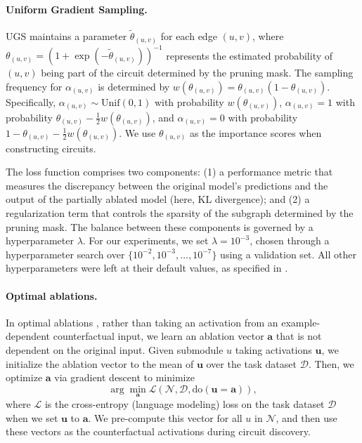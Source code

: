 \documentclass{article}
\theoremstyle{plain}
\theoremstyle{definition}
\theoremstyle{remark}
\begin{document}
\paragraph{Uniform Gradient Sampling.}
UGS maintains a parameter $\tilde{\theta}_{(u,v)}$ for each edge $(u,v)$, where $\theta_{(u,v)} = (1 + \exp(-\tilde{\theta}_{(u,v)}))^{-1}$ represents the estimated probability of $(u,v)$ being part of the circuit determined by the pruning mask. The sampling frequency for $\alpha_{(u,v)}$ is determined by $w(\theta_{(u,v)}) = \theta_{(u,v)}(1 - \theta_{(u,v)})$. Specifically, $\alpha_{(u,v)} \sim \text{Unif}(0, 1)$ with probability  $w(\theta_{(u,v)})$,  $\alpha_{(u,v)} = 1$  with probability  $\theta_{(u,v)} - \frac{1}{2}w(\theta_{(u,v)})$, and $\alpha_{(u,v)} = 0$ with probability $1 - \theta_{(u,v)} - \frac{1}{2}w(\theta_{(u,v)})$.
We use $\theta_{(u,v)}$ as the importance scores when constructing circuits.

The loss function comprises two components: (1) a performance metric that measures the discrepancy between the original model’s predictions and the output of the partially ablated model (here, KL divergence); and (2) a regularization term that controls the sparsity of the subgraph determined by the pruning mask. The balance between these components is governed by a hyperparameter $\lambda$.
For our experiments, we set $\lambda = 10^{-3}$, chosen through a hyperparameter search over $\{10^{-2}, 10^{-3}, \dots, 10^{-7}\}$ using a validation set. All other hyperparameters were left at their default values, as specified in \citet{li2024optimal}.

\paragraph{Optimal ablations.}\label{app:oa} In optimal ablations \citep{li2024optimal}, rather than taking an activation from an example-dependent counterfactual input, we learn an ablation vector $\mathbf{a}$ that is not dependent on the original input. Given submodule $u$ taking activations $\mathbf{u}$, we initialize the ablation vector to the mean of $\mathbf{u}$ over the task dataset $\mathcal{D}$. Then, we optimize $\mathbf{a}$ via gradient descent to minimize
\begin{equation}
    \arg\min_\mathbf{a}\mathcal{L}(\mathcal{N},\mathcal{D},\text{do}(\mathbf{u}=\mathbf{a})),
\end{equation}
where $\mathcal{L}$ is the cross-entropy (language modeling) loss on the task dataset $\mathcal{D}$ when we set $\mathbf{u}$ to $\mathbf{a}$. We pre-compute this vector for all $u$ in $\mathcal{N}$, and then use these vectors as the counterfactual activations during circuit discovery.
\end{document}

